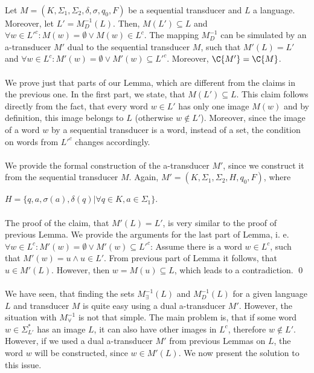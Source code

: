 \paragraph{}
\clema Let $M = (K, \Sigma_1, \Sigma_2, \delta, \sigma, q_0, F)$ be a sequential transducer and $L$ a language. Moreover, let $L' = M_{D}^{-1}(L)$. Then, $M(L') \subseteq L$ and $\forall w \in L'^c: M(w) = \emptyset \vee M(w) \in L^c$. The mapping $M_D^{-1}$ can be simulated by an a-transducer $M'$ dual to the sequential transducer $M$, such that $M'(L) = L'$ and $\forall w \in L^c: M'(w) = \emptyset \vee M'(w) \subseteq L'^c$. Moreover, $\C{M'} = \C{M}$.

\paragraph{}
\dokaz We prove just that parts of our Lemma, which are different from the claims in the previous one. In the first part, we state, that $M(L') \subseteq L$. This claim follows directly from the fact, that every word $w \in L'$ has only one image $M(w)$ and by definition, this image belongs to $L$ (otherwise $w \notin L'$). Moreover, since the image of a word $w$ by a sequential transducer is a word, instead of a set, the condition on words from $L'^c$ changes accordingly.

\paragraph{}
We provide the formal construction of the a-transducer $M'$, since we construct it from the sequential transducer $M$. Again, $M' = (K,\Sigma_1,\Sigma_2,H,q_0,F)$, where \\
\centerline{$H = \{q,a,\sigma(a),\delta(q) | \forall q \in K, a \in \Sigma_1 \}$.}

\paragraph{}
The proof of the claim, that $M'(L) = L'$, is very similar to the proof of previous Lemma. We provide the arguments for the last part of Lemma, i. e. $\forall w \in L^c: M'(w) = \emptyset \vee M'(w) \subseteq L'^c$: Assume there is a word $w \in L^c$, such that $M'(w) = u \wedge u \in L'$. From previous part of Lemma it follows, that $u \in M'(L)$. However, then $w = M(u) \subseteq L$, which leads to a contradiction. \qed

\paragraph{}
We have seen, that finding the sets $M_{\exists}^{-1}(L)$ and $M_D^{-1}(L)$ for a given language $L$ and transducer $M$ is quite easy using a dual a-transducer $M'$. However, the situation with $M_{\forall}^{-1}$ is not that simple. The main problem is, that if some word $w \in \Sigma_{L'}^*$ has an image $L$, it can also have other images in $L^c$, therefore $w \notin L'$. However, if we used a dual a-transducer $M'$ from previous Lemmas on $L$, the word $w$ will be constructed, since $w \in M'(L)$. We now present the solution to this issue.

